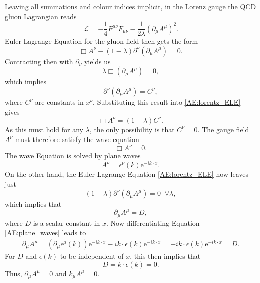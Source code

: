 \documentclass[a4paper, twoside, english, 12pt]{report}
\begin{document}
Leaving all summations and colour indices implicit, in the Lorenz gauge the QCD gluon Lagrangian reads
\begin{equation}
\mathcal{L} = - \frac{1}{4}F^{\mu\nu}F_{\mu\nu} - \frac{1}{2\lambda}(\partial_\mu A^\mu)^2.
\end{equation}
Euler-Lagrange Equation for the gluon field then gets the form
\begin{equation}\label{AE:lorentz_ELE}
\Box A^\nu -(1-\lambda)\partial^\nu\left(\partial_\mu A^\mu\right)= 0.
\end{equation}
Contracting then with $\partial_\nu$ yields us
\begin{equation}
	\lambda\Box\left(\partial_\mu A^\mu\right) = 0,
\end{equation}
which implies
\begin{equation}
\partial^\nu\left(\partial_\mu A^\mu\right) = C^\nu,
\end{equation}
where $C^\nu$ are constants in $x^\nu$. Substituting this result into \eqref{AE:lorentz_ELE} gives
\begin{equation}
	\Box A^\nu = (1-\lambda)C^\nu.
\end{equation}
As this must hold for any $\lambda$, the only possibility is that $C^\nu=0$. The gauge field $A^\nu$ must therefore satisfy the wave equation
\begin{equation}
	\Box A^\nu = 0.
\end{equation}
The wave Equation is solved by plane waves
\begin{equation}\label{AE:plane_waves}
	A^\nu = \epsilon^\nu(k)\text{e}^{-ik\cdot x}.
\end{equation}
On the other hand, the Euler-Lagrange Equation \eqref{AE:lorentz_ELE} now leaves just
\begin{equation}
(1-\lambda)\partial^\nu\left(\partial_\mu A^\mu\right)= 0 \; \; \forall \lambda,
\end{equation}
which implies that
\begin{equation}
	\partial_\mu A^\mu = D,
\end{equation}
where $D$ is a scalar constant in $x$. Now differentiating Equation \eqref{AE:plane_waves} leads to
\begin{align}
	\partial_\mu A^\mu = \left(\partial_\mu \epsilon^\mu(k)\right)\text{e}^{-ik\cdot x} -ik\cdot \epsilon(k)\text{e}^{-ik\cdot x} = -ik\cdot \epsilon(k)\text{e}^{-ik\cdot x} = D.
\end{align}
For $D$ and $\epsilon(k)$ to be independent of $x$, this then implies that
\begin{equation}\label{AE:pol_k}
	D = k\cdot \epsilon(k) = 0.
\end{equation}
Thus, $\partial_\mu A^\mu=0$ and $k_\mu A^\mu=0$.
\end{document}
